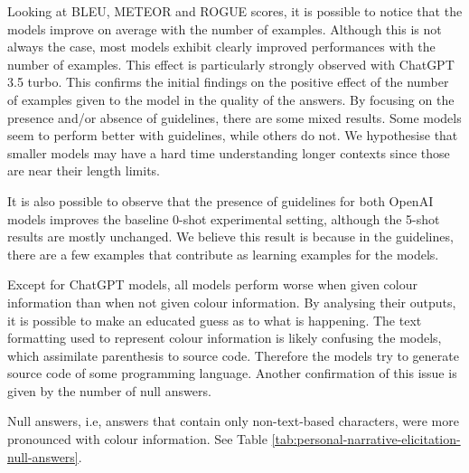 



Looking at BLEU, METEOR and ROGUE scores, it is possible to notice that the models improve on average with the number of examples. Although this is not always the case, most models exhibit clearly improved performances with the number of examples. This effect is particularly strongly observed with ChatGPT 3.5 turbo. This confirms the initial findings on the positive effect of the number of examples given to the model in the quality of the answers.
By focusing on the presence and/or absence of guidelines, there are some mixed results. Some models seem to perform better with guidelines, while others do not. We hypothesise that smaller models may have a hard time understanding longer contexts since those are near their length limits. 

It is also possible to observe that the presence of guidelines for both OpenAI models improves the baseline 0-shot experimental setting, although the 5-shot results are mostly unchanged. We believe this result is because in the guidelines, there are a few examples that contribute as learning examples for the models.  

Except for ChatGPT models, all models perform worse when given colour information than when not given colour information. By analysing their outputs, it is possible to make an educated guess as to what is happening. The text formatting used to represent colour information is likely confusing the models, which assimilate parenthesis to source code. Therefore the models try to generate source code of some programming language. Another confirmation of this issue is given by the number of null answers. 

Null answers, i.e, answers that contain only non-text-based characters, were more pronounced with colour information. See Table \ref{tab:personal-narrative-elicitation-null-answers}.


